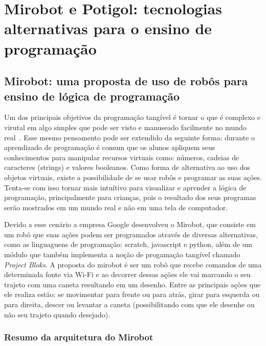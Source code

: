 \chapter{Mirobot e Potigol: tecnologias alternativas para o ensino de programação}
\label{cap:referencial}

\section{Mirobot: uma proposta de uso de robôs para ensino de lógica de
programação}
\label{sec:mirobot}

Um dos principais objetivos da programação tangível é tornar o que é complexo e
virutal em algo simples que pode ser visto e manuseado facilmente no mundo
real~\cite{Horn2008, Horn2007, McNerney2000}. Esse mesmo pensamento pode ser extendido da seguinte forma: durante o aprendizado de programação é comum que os alunos apliquem seus
conhecimentos para manipular recursos virtuais como: números, cadeias de
caracteres (strings) e valores booleanos. 
Como forma de alternativa ao uso dos
objetos virtuais, existe a possibilidade de se usar robôs e programar as suas
ações. 
Tenta-se com isso tornar mais intuítivo para visualizar e aprender a
lógica de programação, principalmente para crianças, pois o resultado dos
seus programas serão mostrados em um mundo real e não em uma tela de computador.

Devido a esse cenário a empresa Google desenvolveu o Mirobot, que consiste em um robô
que suas ações podem ser programados através de diversas alternativas, como as
linguaguens de programação: scratch, javascript e python, além de um módulo que
também implementa a noção de progamação tangível chamado \textit{Project Bloks}. 
A proposta do mirobot é ser um robô que recebe comandos de uma determinada fonte
via Wi-Fi e ao decorrer dessas ações ele vai marcando o seu trajeto com uma
caneta resultando em um desenho.
Entre as principais ações que ele realiza
estão: se movimentar para frente ou para atrás, girar para esquerda ou para
direita, descer ou levantar a caneta (possibilitando com que ele desenhe ou não
seu trajeto quando desejado).


\subsection{Resumo da arquitetura do Mirobot}


